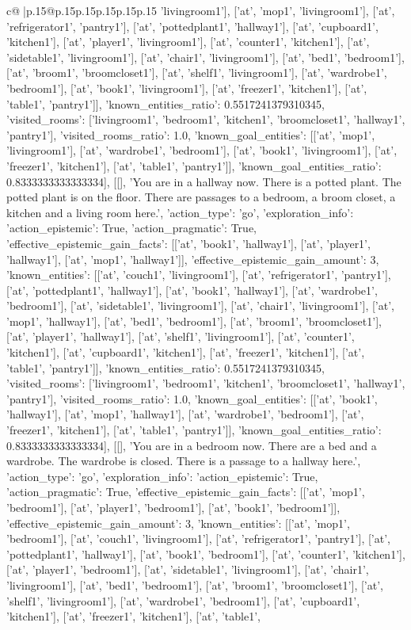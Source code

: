 \documentclass{article}
\begin{document}
{\begin{supertabular}{c@{$\;$}|p{.15\linewidth}@{}p{.15\linewidth}p{.15\linewidth}p{.15\linewidth}p{.15\linewidth}p{.15\linewidth}}
{{{'livingroom1'], ['at', 'mop1', 'livingroom1'], ['at', 'refrigerator1', 'pantry1'], ['at', 'pottedplant1', 'hallway1'], ['at', 'cupboard1', 'kitchen1'], ['at', 'player1', 'livingroom1'], ['at', 'counter1', 'kitchen1'], ['at', 'sidetable1', 'livingroom1'], ['at', 'chair1', 'livingroom1'], ['at', 'bed1', 'bedroom1'], ['at', 'broom1', 'broomcloset1'], ['at', 'shelf1', 'livingroom1'], ['at', 'wardrobe1', 'bedroom1'], ['at', 'book1', 'livingroom1'], ['at', 'freezer1', 'kitchen1'], ['at', 'table1', 'pantry1']], 'known_entities_ratio': 0.5517241379310345, 'visited_rooms': ['livingroom1', 'bedroom1', 'kitchen1', 'broomcloset1', 'hallway1', 'pantry1'], 'visited_rooms_ratio': 1.0, 'known_goal_entities': [['at', 'mop1', 'livingroom1'], ['at', 'wardrobe1', 'bedroom1'], ['at', 'book1', 'livingroom1'], ['at', 'freezer1', 'kitchen1'], ['at', 'table1', 'pantry1']], 'known_goal_entities_ratio': 0.8333333333333334}}], [[], 'You are in a hallway now. There is a potted plant. The potted plant is on the floor. There are passages to a bedroom, a broom closet, a kitchen and a living room here.', {'action_type': 'go', 'exploration_info': {'action_epistemic': True, 'action_pragmatic': True, 'effective_epistemic_gain_facts': [['at', 'book1', 'hallway1'], ['at', 'player1', 'hallway1'], ['at', 'mop1', 'hallway1']], 'effective_epistemic_gain_amount': 3, 'known_entities': [['at', 'couch1', 'livingroom1'], ['at', 'refrigerator1', 'pantry1'], ['at', 'pottedplant1', 'hallway1'], ['at', 'book1', 'hallway1'], ['at', 'wardrobe1', 'bedroom1'], ['at', 'sidetable1', 'livingroom1'], ['at', 'chair1', 'livingroom1'], ['at', 'mop1', 'hallway1'], ['at', 'bed1', 'bedroom1'], ['at', 'broom1', 'broomcloset1'], ['at', 'player1', 'hallway1'], ['at', 'shelf1', 'livingroom1'], ['at', 'counter1', 'kitchen1'], ['at', 'cupboard1', 'kitchen1'], ['at', 'freezer1', 'kitchen1'], ['at', 'table1', 'pantry1']], 'known_entities_ratio': 0.5517241379310345, 'visited_rooms': ['livingroom1', 'bedroom1', 'kitchen1', 'broomcloset1', 'hallway1', 'pantry1'], 'visited_rooms_ratio': 1.0, 'known_goal_entities': [['at', 'book1', 'hallway1'], ['at', 'mop1', 'hallway1'], ['at', 'wardrobe1', 'bedroom1'], ['at', 'freezer1', 'kitchen1'], ['at', 'table1', 'pantry1']], 'known_goal_entities_ratio': 0.8333333333333334}}], [[], 'You are in a bedroom now. There are a bed and a wardrobe. The wardrobe is closed. There is a passage to a hallway here.', {'action_type': 'go', 'exploration_info': {'action_epistemic': True, 'action_pragmatic': True, 'effective_epistemic_gain_facts': [['at', 'mop1', 'bedroom1'], ['at', 'player1', 'bedroom1'], ['at', 'book1', 'bedroom1']], 'effective_epistemic_gain_amount': 3, 'known_entities': [['at', 'mop1', 'bedroom1'], ['at', 'couch1', 'livingroom1'], ['at', 'refrigerator1', 'pantry1'], ['at', 'pottedplant1', 'hallway1'], ['at', 'book1', 'bedroom1'], ['at', 'counter1', 'kitchen1'], ['at', 'player1', 'bedroom1'], ['at', 'sidetable1', 'livingroom1'], ['at', 'chair1', 'livingroom1'], ['at', 'bed1', 'bedroom1'], ['at', 'broom1', 'broomcloset1'], ['at', 'shelf1', 'livingroom1'], ['at', 'wardrobe1', 'bedroom1'], ['at', 'cupboard1', 'kitchen1'], ['at', 'freezer1', 'kitchen1'], ['at', 'table1', }}}
\end{supertabular}}
\end{document}
